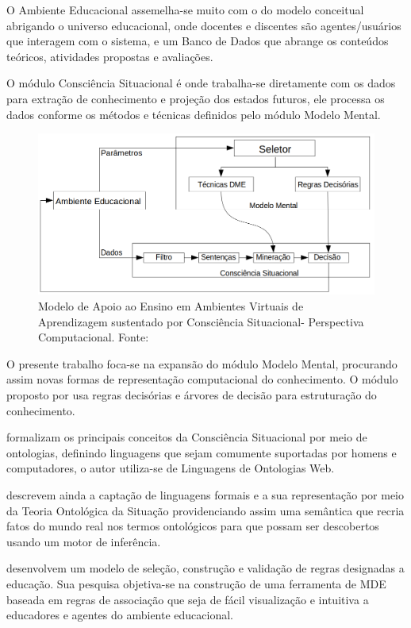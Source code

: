 \documentclass[
	oneside,
	12pt,				%
	a4paper,			%
	english,			%
	brazil,				%
	article
	]{abntex2}
\begin{document}
{O Ambiente Educacional assemelha-se muito com o do modelo conceitual abrigando o universo educacional, onde docentes e discentes são agentes/usuários que interagem com o sistema, e um Banco de Dados que abrange os conteúdos teóricos, atividades propostas e avaliações.

O módulo Consciência Situacional é onde trabalha-se diretamente com os dados para extração de conhecimento e projeção dos estados futuros, ele processa os dados conforme os métodos e técnicas definidos pelo módulo Modelo Mental.

\begin{figure}[H]	
	\centering
	\includegraphics[scale=0.45]{modelo_persp_comp}
	\caption{Modelo de Apoio ao Ensino em Ambientes Virtuais de Aprendizagem sustentado por Consciência Situacional- Perspectiva Computacional. Fonte: \cite{Martins2018} }
	\label{modeloSAemAVAcomp}	
\end{figure}

\newpage

O presente trabalho foca-se na expansão do módulo Modelo Mental, procurando assim novas formas de representação computacional do conhecimento. O módulo proposto por  usa regras decisórias e árvores de decisão para estruturação do conhecimento.

 formalizam os principais conceitos da Consciência Situacional por meio de ontologias, definindo linguagens que sejam comumente suportadas por homens e computadores, o autor utiliza-se de Linguagens de Ontologias Web. 

 descrevem ainda a captação de linguagens formais e a sua representação por meio da Teoria Ontológica da Situação providenciando assim uma semântica que recria fatos do mundo real nos termos ontológicos para que possam ser descobertos usando um motor de inferência. 

 desenvolvem um modelo de seleção, construção e validação de regras designadas a educação. Sua pesquisa objetiva-se na construção de uma ferramenta de MDE baseada em regras de associação que seja de fácil visualização e intuitiva a educadores e agentes do ambiente educacional.
 
}
\end{document}

